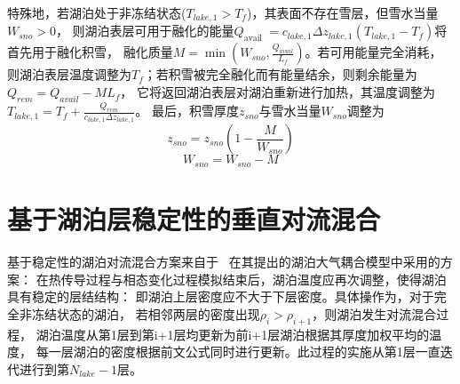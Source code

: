 特殊地，若湖泊处于非冻结状态($T_{lake,1}>T_f$)，其表面不存在雪层，但雪水当量$W_{sno}>0$，
则湖泊表层可用于融化的能量$Q_{\text {avail }}=c_{lake, 1} \Delta z_{lake, 1}\left(T_{lake, 1}-T_{f}\right)$将首先用于融化积雪，
融化质量$M=\min{\left(W_{sno},\frac{Q_{avail}}{L_f}\right)}$。若可用能量完全消耗，
则湖泊表层温度调整为$T_f$；若积雪被完全融化而有能量结余，则剩余能量为$Q_{rem}=Q_{avail}-ML_f$，
它将返回湖泊表层对湖泊重新进行加热，其温度调整为$T_{lake, 1}=T_{f}+\frac{Q_{rem}}{c_{lake, 1} \Delta z_{lake, 1}}$。
最后，积雪厚度$z_{sno}$与雪水当量$W_{sno}$调整为
\begin{equation}
z_{sno}=z_{sno}\left(1-\frac{M}{W_{sno}}\right)
\end{equation}
\begin{equation}
W_{sno}=W_{sno}-M
\end{equation}

\section{基于湖泊层稳定性的垂直对流混合}
基于稳定性的湖泊对流混合方案来自于~\citet{hostetler1993interactive,hostetler1994lake} 在其提出的湖泊大气耦合模型中采用的方案：
在热传导过程与相态变化过程模拟结束后，湖泊温度应再次调整，使得湖泊具有稳定的层结结构：
即湖泊上层密度应不大于下层密度。具体操作为，对于完全非冻结状态的湖泊，
若相邻两层的密度出现$\rho_i>\rho_{i+1}$，则湖泊发生对流混合过程，
湖泊温度从第1层到第i+1层均更新为前i+1层湖泊根据其厚度加权平均的温度，
每一层湖泊的密度根据前文公式同时进行更新。此过程的实施从第1层一直迭代进行到第$N_{lake}-1$层。

